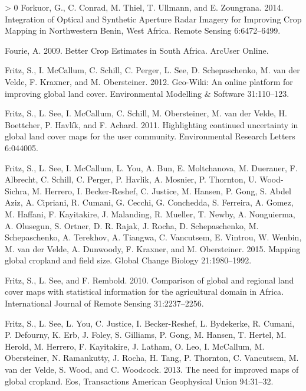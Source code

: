 \documentclass[11pt,a4paper]{article}
\newlength{\cslhangindent}
\newenvironment{CSLReferences}[3] %
 {%
  \setlength{\parindent}{0pt}
  \ifodd #1 \everypar{\setlength{\hangindent}{\cslhangindent}}\ignorespaces\fi
  \ifnum #2 > 0
  \setlength{\parskip}{#2\baselineskip}
  \fi
 }%
 {}
\begin{document}
\begin{CSLReferences}{1}{0}
\leavevmode\hypertarget{ref-forkuorIntegrationOpticalSynthetic2014}{}%
Forkuor, G., C. Conrad, M. Thiel, T. Ullmann, and E. Zoungrana. 2014.
Integration of {Optical} and {Synthetic Aperture Radar Imagery} for
{Improving Crop Mapping} in {Northwestern Benin}, {West Africa}. Remote
Sensing 6:6472--6499.

\leavevmode\hypertarget{ref-FourieBetterCropEstimates2009}{}%
Fourie, A. 2009. Better {Crop Estimates} in {South Africa}. ArcUser
Online.

\leavevmode\hypertarget{ref-FritzGeoWikionlineplatform2012}{}%
Fritz, S., I. McCallum, C. Schill, C. Perger, L. See, D. Schepaschenko,
M. van der Velde, F. Kraxner, and M. Obersteiner. 2012. Geo-{Wiki}: An
online platform for improving global land cover. Environmental Modelling
\& Software 31:110--123.

\leavevmode\hypertarget{ref-FritzHighlightingcontinueduncertainty2011}{}%
Fritz, S., L. See, I. McCallum, C. Schill, M. Obersteiner, M. van der
Velde, H. Boettcher, P. Havlík, and F. Achard. 2011. Highlighting
continued uncertainty in global land cover maps for the user community.
Environmental Research Letters 6:044005.

\leavevmode\hypertarget{ref-FritzMappingglobalcropland2015}{}%
Fritz, S., L. See, I. McCallum, L. You, A. Bun, E. Moltchanova, M.
Duerauer, F. Albrecht, C. Schill, C. Perger, P. Havlik, A. Mosnier, P.
Thornton, U. Wood-Sichra, M. Herrero, I. Becker-Reshef, C. Justice, M.
Hansen, P. Gong, S. Abdel Aziz, A. Cipriani, R. Cumani, G. Cecchi, G.
Conchedda, S. Ferreira, A. Gomez, M. Haffani, F. Kayitakire, J.
Malanding, R. Mueller, T. Newby, A. Nonguierma, A. Olusegun, S. Ortner,
D. R. Rajak, J. Rocha, D. Schepaschenko, M. Schepaschenko, A. Terekhov,
A. Tiangwa, C. Vancutsem, E. Vintrou, W. Wenbin, M. van der Velde, A.
Dunwoody, F. Kraxner, and M. Obersteiner. 2015. Mapping global cropland
and field size. Global Change Biology 21:1980--1992.

\leavevmode\hypertarget{ref-FritzComparisonglobalregional2010}{}%
Fritz, S., L. See, and F. Rembold. 2010. Comparison of global and
regional land cover maps with statistical information for the
agricultural domain in {Africa}. International Journal of Remote Sensing
31:2237--2256.

\leavevmode\hypertarget{ref-Fritzneedimprovedmaps2013}{}%
Fritz, S., L. See, L. You, C. Justice, I. Becker-Reshef, L. Bydekerke,
R. Cumani, P. Defourny, K. Erb, J. Foley, S. Gilliams, P. Gong, M.
Hansen, T. Hertel, M. Herold, M. Herrero, F. Kayitakire, J. Latham, O.
Leo, I. McCallum, M. Obersteiner, N. Ramankutty, J. Rocha, H. Tang, P.
Thornton, C. Vancutsem, M. van der Velde, S. Wood, and C. Woodcock.
2013. The need for improved maps of global cropland. Eos, Transactions
American Geophysical Union 94:31--32.


\end{CSLReferences}
\end{document}
